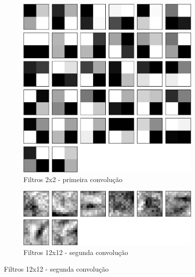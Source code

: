 \documentclass[
	12pt,				%
	oneside,			%
	a4paper,			%
	english,			%
	french,				%
	spanish,			%
	brazil,				%
	]{abntex2}
\begin{document}
\begin{figure}[H]
	\centering
	
	\begin{subfigure}{.8\textwidth}
		\centering
		\includegraphics[width=.6\linewidth]{images/fabio/resultados/network_3/filter_convolution2d_1}%
		\caption{Filtros 2x2 - primeira convolução}		
		\label{fig:conv1_filtro}	
	\end{subfigure}%
	
	\begin{subfigure}{.8\textwidth}
		\centering
		\includegraphics[width=.6\linewidth]{images/fabio/resultados/network_3/filter_convolution2d_2}
		\caption{Filtros 12x12 - segunda convolução}		
		\label{fig:conv2_filtro}	
	\end{subfigure}%
	

\end{figure}
\end{document}
